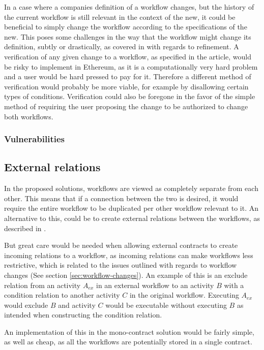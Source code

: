 \documentclass{article}
\begin{document}
		In a case where a companies definition of a workflow changes, but the history of the current workflow is still relevant in the context of the new, it could be beneficial to simply change the workflow according to the specifications of the new.
		This poses some challenges in the way that the workflow might change its definition, subtly or drastically, as covered in \cite{hierarchical-declarative-modelling} with regards to refinement.
		A verification of any given change to a workflow, as specified in the article, would be risky to implement in Ethereum, as it is a computationally very hard problem and a user would be hard pressed to pay for it.
		Therefore a different method of verification would probably be more viable, for example by disallowing certain types of conditions.
		Verification could also be foregone in the favor of the simple method of requiring the user proposing the change to be authorized to change both workflows. 

			\subsubsection{Vulnerabilities}

		\subsection{External relations}
		\label{sec:external-relations}
		In the proposed solutions, workflows are viewed as completely separate from each other. 
		This means that if a connection between the two is desired, it would require the entire workflow to be duplicated per other workflow relevant to it.
		An alternative to this, could be to create external relations between the workflows, as described in \cite{distributed-workflows}.

		But great care would be needed when allowing external contracts to create incoming relations to a workflow, as incoming relations can make workflows less restrictive, which is related to the issues outlined with regards to workflow changes (See section \ref{sec:workflow-changes}). 
		An example of this is an exclude relation from an activity $A_{ex}$ in an external workflow to an activity $B$ with a condition relation to another activity $C$ in the original workflow. 
		Executing $A_{ex}$ would exclude $B$ and activity $C$ would be executable without executing $B$ as intended when constructing the condition relation.

		An implementation of this in the mono-contract solution would be fairly simple, as well as cheap, as all the workflows are potentially stored in a single contract.
\end{document}
